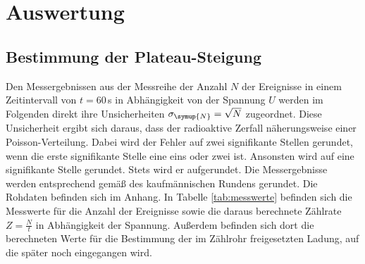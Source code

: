 \section{Auswertung}
\label{sec:Auswertung}

\subsection{Bestimmung der Plateau-Steigung}
\label{subsec:plateau}

Den Messergebnissen aus der Messreihe der Anzahl $N$ der Ereignisse in einem Zeitintervall
von $t=60\,$s in Abhängigkeit von der Spannung $U$ werden im Folgenden direkt ihre
Unsicherheiten $\sigma_{\symup{N}}=\sqrt{N}$ zugeordnet. Diese Unsicherheit ergibt
sich daraus, dass der radioaktive Zerfall näherungsweise einer Poisson-Verteilung.
Dabei wird der Fehler auf zwei signifikante Stellen gerundet, wenn die
erste signifikante Stelle eine eins oder zwei ist. Ansonsten wird auf eine signifikante
Stelle gerundet. Stets wird er aufgerundet. Die Messergebnisse werden entsprechend
gemäß des kaufmännischen Rundens gerundet. Die Rohdaten befinden sich im Anhang.
In Tabelle \ref{tab:messwerte} befinden sich die Messwerte für die Anzahl der
Ereignisse sowie die daraus berechnete Zählrate $Z=\frac{N}{t}$ in Abhängigkeit
der Spannung. Außerdem befinden sich dort die berechneten Werte für die Bestimmung
der im Zählrohr freigesetzten Ladung, auf die später noch eingegangen
wird.

